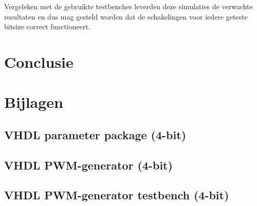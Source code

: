 \documentclass{article}
\begin{document}
Vergeleken met de gebruikte testbenches leverden deze simulaties de verwachte resultaten en dus mag gesteld worden dat de schakelingen voor iedere geteste bitsize correct functioneert.

\section{Conclusie}
\label{sec:pwm-conclusie}

\section{Bijlagen}
\label{sec:pwm-bijlagen}

\subsection{VHDL parameter package (4-bit)}
\label{vhdl:pwm-gen-pack}

\subsection{VHDL PWM-generator (4-bit)}
\label{vhdl:pwm-gen}

\subsection{VHDL PWM-generator testbench (4-bit)}
\label{vhdl:pwm-gen-tb}
\end{document}
